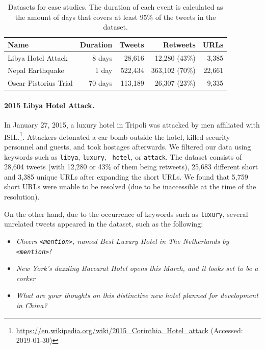 \begin{table}[h]
  \centering
  \begin{tabular}{@{}lrrrr@{}}
  \toprule
  Name                  & Duration & Tweets & Retweets & URLs  \\ \midrule
  Libya Hotel Attack    & 8 days   & 28,616 & 12,280 (43\%)  & 3,385            \\
  Nepal Earthquake      & 1 day   & 522,434 & 363,102 (70\%) & 22,661          \\ 
  Oscar Pistorius Trial & 70 days  & 113,189 & 26,307 (23\%)  & 9,335           \\ \bottomrule
  \end{tabular}
  \caption[Datasets for case studies.]{Datasets for case studies. The duration of each event is calculated as the amount of days that covers at least 95\% of the tweets in the dataset.}
  \label{tab:datasets}
\end{table}


\paragraph{2015 Libya Hotel Attack.} 
%
In January 27, 2015, a luxury hotel in Tripoli was attacked by men affiliated
with
ISIL.\footnote{\url{https://en.wikipedia.org/wiki/2015_Corinthia_Hotel_attack}
(Accessed: 2019-01-30)}. 
%
Attackers detonated a car bomb outside the hotel, killed security personnel and
guests, and took hostages afterwards. 
%
We filtered our data using keywords such as {\tt libya}, {\tt luxury}, {\tt
hotel}, or {\tt attack}. 
The dataset consists of 28,604 tweets (with 12,280 or 43\% of them being
retweets), 25,683 different short and 3,385 unique URLs after expanding the
short URLs. 
%
We found that 5,759 short URLs were unable to be resolved (due to be
inaccessible at the time of the resolution).

On the other hand, due to the occurrence of keywords such as {\tt luxury},
several unrelated tweets appeared in the dataset, such as the following:

\begin{itemize}
\item {\it Cheers {\tt <mention>}, named Best Luxury Hotel in The Netherlands by {\tt <mention>}!}
\item {\it New York's dazzling Baccarat Hotel opens this March, and it looks set to be a corker}
\item {\it What are your thoughts on this distinctive new hotel planned for development in China?}
\end{itemize}

